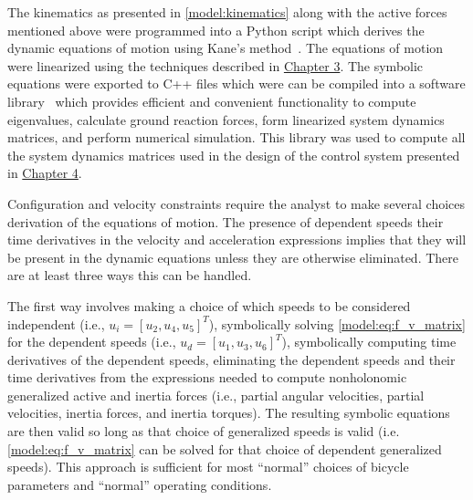 The kinematics as presented in \autoref{model:kinematics} along with the active
forces mentioned above were programmed into a Python script which derives the
dynamic equations of motion using Kane's method~\cite{Kane1985}. The equations
of motion were linearized using the techniques described in \hyperref[chapter3]{Chapter 3}.
The symbolic equations were exported to C++ files which were can be compiled
into a software library~\cite{libbicycle} which provides efficient and
convenient functionality to compute eigenvalues, calculate ground reaction
forces, form linearized system dynamics matrices, and perform numerical
simulation. This library was used to compute all the system dynamics matrices
used in the design of the control system presented in \hyperref[chapter4]{Chapter 4}.

Configuration and velocity constraints require the analyst to make several
choices derivation of the equations of motion. The presence of dependent speeds
their time derivatives in the velocity and acceleration expressions implies
that they will be present in the dynamic equations unless they are otherwise
eliminated. There are at least three ways this can be handled.

The first way involves making a choice of which speeds to be considered
independent (i.e., $u_i=[u_2, u_4, u_5]^T$), symbolically solving
\autoref{model:eq:f_v_matrix} for the dependent speeds (i.e., $u_d = [u_1, u_3,
u_6]^T$), symbolically computing time derivatives of the dependent speeds,
eliminating the dependent speeds and their time derivatives from the
expressions needed to compute nonholonomic generalized active and inertia
forces (i.e., partial angular velocities, partial velocities, inertia forces,
and inertia torques). The resulting symbolic equations are then valid so long
as that choice of generalized speeds is valid (i.e.
\autoref{model:eq:f_v_matrix} can be solved for that choice of dependent
generalized speeds). This approach is sufficient for most ``normal'' choices of
bicycle parameters and ``normal'' operating conditions.

